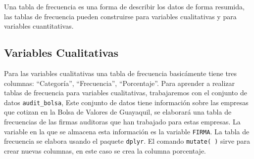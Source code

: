 \documentclass[]{book}
\newenvironment{Shaded}{\begin{snugshade}}{\end{snugshade}}
\newcommand{\KeywordTok}[1]{\textcolor[rgb]{0.13,0.29,0.53}{\textbf{#1}}}
\newcommand{\DataTypeTok}[1]{\textcolor[rgb]{0.13,0.29,0.53}{#1}}
\newcommand{\DecValTok}[1]{\textcolor[rgb]{0.00,0.00,0.81}{#1}}
\newcommand{\StringTok}[1]{\textcolor[rgb]{0.31,0.60,0.02}{#1}}
\newcommand{\OtherTok}[1]{\textcolor[rgb]{0.56,0.35,0.01}{#1}}
\newcommand{\OperatorTok}[1]{\textcolor[rgb]{0.81,0.36,0.00}{\textbf{#1}}}
\newcommand{\NormalTok}[1]{#1}
\begin{document}
Una tabla de frecuencia es una forma de describir los datos de forma
resumida, las tablas de frecuencia pueden construirse para variables
cualitativas y para variables cuantitativas.

\subsection{Variables Cualitativas}\label{variables-cualitativas}

Para las variables cualitativas una tabla de frecuencia basicámente
tiene tres columnas: ``Categoría'', ``Frecuencia'', ``Porcentaje''. Para
aprender a realizar tablas de frecuencia para variables cualitativas,
trabajaremos con el conjunto de datos \texttt{audit\_bolsa}, Este
conjunto de datos tiene información sobre las empresas que cotizan en la
Bolsa de Valores de Guayaquil, se elaborará una tabla de frecuencias de
las firmas auditoras que han trabajado para estas empresas. La variable
en la que se almacena esta información es la variable \texttt{FIRMA}. La
tabla de frecuencia se elabora usando el paquete \texttt{dplyr}. El
comando \texttt{mutate(\ )} sirve para crear nuevas columnas, en este
caso se crea la columna porcentaje.

\begin{Shaded}
\end{Shaded}
\end{document}
